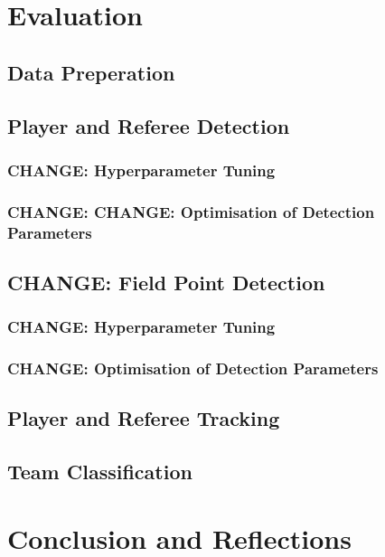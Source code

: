 \documentclass[12pt, letterpaper]{article}
\begin{document}
\newpage



\section{Evaluation}

\subsection{Data Preperation}
\subsection{Player and Referee Detection}
\subsubsection{\textbf{CHANGE}: Hyperparameter Tuning}
\subsubsection{\textbf{CHANGE}: \textbf{CHANGE}: Optimisation of Detection Parameters}
\subsection{\textbf{CHANGE}: Field Point Detection}
\subsubsection{\textbf{CHANGE}: Hyperparameter Tuning}
\subsubsection{\textbf{CHANGE}: Optimisation of Detection Parameters}
\subsection{Player and Referee Tracking}
\subsection{Team Classification}
\newpage



\section{Conclusion and Reflections}
\end{document}
